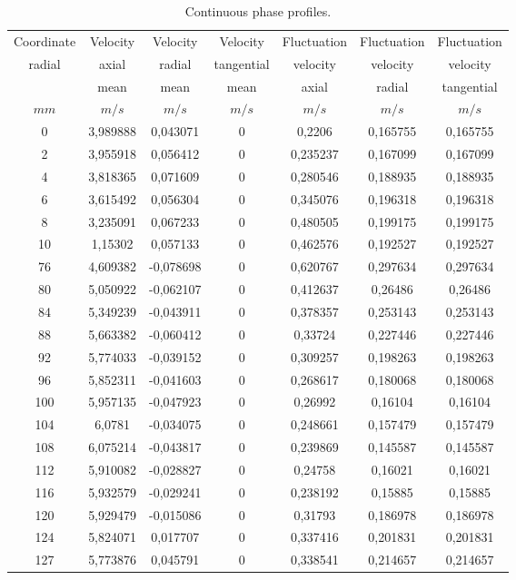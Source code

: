 \begin{itemize}
\begin{description}
\begin{table}[H]
\begin{center}
\begin{tabular}{|c|c|c|c|c|c|c|} \hline
Coordinate  & Velocity  & Velocity  & Velocity &
Fluctuation  & Fluctuation  & Fluctuation  \\
radial  & axial    &   radial  &  tangential   & velocity
& velocity    & velocity   \\
&mean & mean  & mean &  axial
&    radial &  tangential  \\
$mm$   & $m/s$  &  $m/s$ & $m/s$ & $m/s$& $m/s$& $m/s$ \\  \hline
0    & 3,989888 &  0,043071 & 0  & 0,2206   & 0,165755 & 0,165755 \\   \hline
2    & 3,955918 &  0,056412 & 0  & 0,235237 & 0,167099 & 0,167099 \\   \hline
4    & 3,818365 &  0,071609 & 0  & 0,280546 & 0,188935 & 0,188935 \\   \hline
6    & 3,615492 &  0,056304 & 0  & 0,345076 & 0,196318 & 0,196318 \\   \hline
8    & 3,235091 &  0,067233 & 0  & 0,480505 & 0,199175 & 0,199175 \\   \hline
10    & 1,15302  &  0,057133 & 0  & 0,462576 & 0,192527 & 0,192527 \\   \hline
76    & 4,609382 & -0,078698 & 0  & 0,620767 & 0,297634 & 0,297634 \\   \hline
80    & 5,050922 & -0,062107 & 0  & 0,412637 & 0,26486  & 0,26486  \\   \hline
84    & 5,349239 & -0,043911 & 0  & 0,378357 & 0,253143 & 0,253143 \\   \hline
88    & 5,663382 & -0,060412 & 0  & 0,33724  & 0,227446 & 0,227446 \\   \hline
92    & 5,774033 & -0,039152 & 0  & 0,309257 & 0,198263 & 0,198263 \\   \hline
96    & 5,852311 & -0,041603 & 0  & 0,268617 & 0,180068 & 0,180068 \\   \hline
100    & 5,957135 & -0,047923 & 0  & 0,26992  & 0,16104  & 0,16104  \\   \hline
104    & 6,0781   & -0,034075 & 0  & 0,248661 & 0,157479 & 0,157479 \\   \hline
108    & 6,075214 & -0,043817 & 0  & 0,239869 & 0,145587 & 0,145587 \\   \hline
112    & 5,910082 & -0,028827 & 0  & 0,24758  & 0,16021  & 0,16021  \\   \hline
116    & 5,932579 & -0,029241 & 0  & 0,238192 & 0,15885  & 0,15885  \\   \hline
120    & 5,929479 & -0,015086 & 0  & 0,31793  & 0,186978 & 0,186978 \\   \hline
124    & 5,824071 &  0,017707 & 0  & 0,337416 & 0,201831 & 0,201831 \\   \hline
127    & 5,773876 &  0,045791 & 0  & 0,338541 & 0,214657 & 0,214657 \\   \hline
\end {tabular}
\end{center}
\caption{Continuous phase profiles.}
\label{CL_fluide}
\end{table}


\end{description}
\end{itemize}
